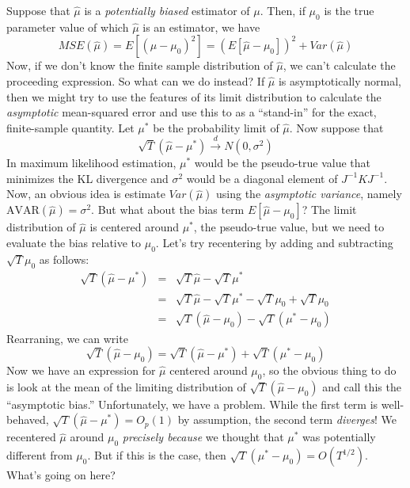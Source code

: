 \documentclass[12pt]{article}
\theoremstyle{definition}
\begin{document}
Suppose that $\widehat{\mu}$ is a \emph{potentially biased} estimator of $\mu$. Then, if $\mu_0$ is the true parameter value of which $\widehat{\mu}$ is an estimator, we have 
	$$MSE(\widehat{\mu}) = E[(\widehat{\mu} - \mu_0)^2] = \left(E[\widehat{\mu} - \mu_0]\right)^2 + Var(\widehat{\mu})$$
Now, if we don't know the finite sample distribution of $\widehat{\mu}$, we can't calculate the proceeding expression. So what can we do instead? If $\widehat{\mu}$ is asymptotically normal, then we might try to use the features of its limit distribution to calculate the \emph{asymptotic} mean-squared error and use this to as a ``stand-in'' for the exact, finite-sample quantity. Let $\mu^*$ be the probability limit of $\widehat{\mu}$. Now suppose that 
	$$\sqrt{T}\left(\widehat{\mu} - \mu^* \right) \overset{d}{\rightarrow} N(0,\sigma^2)$$
In maximum likelihood estimation, $\mu^*$ would be the pseudo-true value that minimizes the KL divergence and $\sigma^2$ would be a diagonal element of $J^{-1}KJ^{-1}$. Now, an obvious idea is estimate $Var(\widehat{\mu})$ using the \emph{asymptotic variance}, namely $\mbox{AVAR}(\widehat{\mu}) = \sigma^2$. But what about the bias term $E[\widehat{\mu} - \mu_0]$? The limit distribution of $\widehat{\mu}$ is centered around $\mu^*$, the pseudo-true value, but we need to evaluate the bias relative to $\mu_0$. Let's try recentering by adding and subtracting $\sqrt{T}\mu_0$ as follows:
\begin{eqnarray*}
	\sqrt{T}\left(\widehat{\mu} - \mu^* \right) &=& \sqrt{T}\widehat{\mu} - \sqrt{T} \mu^*\\
	&=& \sqrt{T}\widehat{\mu} - \sqrt{T} \mu^* - \sqrt{T} \mu_0 + \sqrt{T} \mu_0\\
	&=& \sqrt{T}\left( \widehat{\mu} - \mu_0\right) - \sqrt{T}\left(\mu^* - \mu_0 \right)
\end{eqnarray*}
Rearraning, we can write
	$$\sqrt{T}\left( \widehat{\mu} - \mu_0\right) = \sqrt{T}\left(\widehat{\mu} - \mu^* \right) + \sqrt{T}\left(\mu^* - \mu_0 \right)$$
Now we have an expression for $\widehat{\mu}$ centered around $\mu_0$, so the obvious thing to do is look at the mean of the limiting distribution of $\sqrt{T}\left( \widehat{\mu} - \mu_0\right) $ and call this the ``asymptotic bias.'' Unfortunately, we have a problem. While the first term is well-behaved, 
$\sqrt{T}\left(\widehat{\mu} - \mu^* \right) = O_p(1)$ by assumption, the second term \emph{diverges}! We recentered $\widehat{\mu}$ around $\mu_0$ \emph{precisely because} we thought that $\mu^*$ was potentially different from $\mu_0$. But if this is the case, then $ \sqrt{T}\left(\mu^* - \mu_0 \right) = O(T^{1/2})$. What's going on here?
\end{document}
